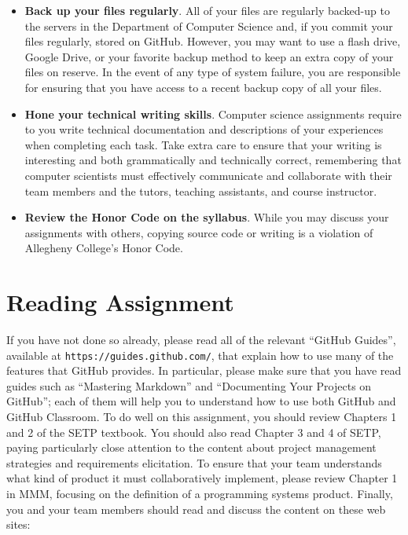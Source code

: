 \documentclass[11pt]{article}
\newcommand{\url}[1]{\lstinline{#1}}
\begin{document}
\begin{itemize}
\item {\bf Back up your files regularly}. All of your files are regularly backed-up to the servers in the Department of
  Computer Science and, if you commit your files regularly, stored on GitHub. However, you may want to use a flash
  drive, Google Drive, or your favorite backup method to keep an extra copy of your files on reserve. In the event of
  any type of system failure, you are responsible for ensuring that you have access to a recent backup copy of all your
  files.

\item {\bf Hone your technical writing skills}. Computer science assignments require to you write technical
  documentation and descriptions of your experiences when completing each task. Take extra care to ensure that your
  writing is interesting and both grammatically and technically correct, remembering that computer scientists must
  effectively communicate and collaborate with their team members and the tutors, teaching assistants, and course
  instructor.

\item {\bf Review the Honor Code on the syllabus}. While you may discuss your assignments with others, copying source
  code or writing is a violation of Allegheny College's Honor Code.

\end{itemize}

\section*{Reading Assignment}

If you have not done so already, please read all of the relevant ``GitHub Guides'', available at
\url{https://guides.github.com/}, that explain how to use many of the features that GitHub provides. In particular,
please make sure that you have read guides such as ``Mastering Markdown'' and ``Documenting Your Projects on GitHub'';
each of them will help you to understand how to use both GitHub and GitHub Classroom. To do well on this assignment, you
should review Chapters 1 and 2 of the SETP textbook. You should also read Chapter 3 and 4 of SETP, paying particularly
close attention to the content about project management strategies and requirements elicitation. To ensure that your
team understands what kind of product it must collaboratively implement, please review Chapter 1 in MMM, focusing on the
definition of a programming systems product. Finally, you and your team members should read and discuss the content on
these web sites:
\end{document}
